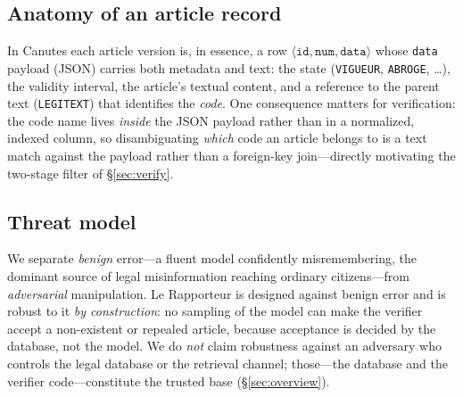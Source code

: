 \subsection{Anatomy of an article record}
In Canutes each article version is, in essence, a row $\langle \texttt{id},
\texttt{num}, \texttt{data} \rangle$ whose \texttt{data} payload (JSON)
carries both metadata and text: the state (\texttt{VIGUEUR}, \texttt{ABROGE},
\ldots), the validity interval, the article's textual content, and a reference
to the parent text (\texttt{LEGITEXT}) that identifies the \emph{code}. One
consequence matters for verification: the code name lives \emph{inside} the
JSON payload rather than in a normalized, indexed column, so disambiguating
\emph{which} code an article belongs to is a text match against the payload
rather than a foreign-key join---directly motivating the two-stage filter of
\S\ref{sec:verify}.

\subsection{Threat model}
We separate \emph{benign} error---a fluent model confidently misremembering,
the dominant source of legal misinformation reaching ordinary citizens---from
\emph{adversarial} manipulation. Le Rapporteur is designed against benign
error and is robust to it \emph{by construction}: no sampling of the model can
make the verifier accept a non-existent or repealed article, because acceptance
is decided by the database, not the model. We do \emph{not} claim robustness
against an adversary who controls the legal database or the retrieval channel;
those---the database and the verifier code---constitute the trusted base
(\S\ref{sec:overview}).
